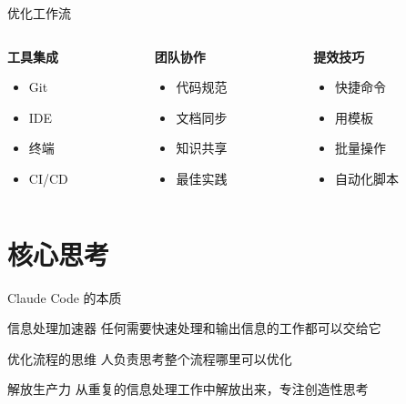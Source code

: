 \documentclass[aspectratio=169,xcolor=dvipsnames]{beamer}
\begin{document}
\begin{frame}{优化工作流}
  \begin{columns}
    \begin{column}{0.3\textwidth}
      \textbf{工具集成}
      \begin{itemize}
        \item Git
        \item IDE
        \item 终端
        \item CI/CD
      \end{itemize}
    \end{column}
    \begin{column}{0.3\textwidth}
      \textbf{团队协作}
      \begin{itemize}
        \item 代码规范
        \item 文档同步
        \item 知识共享
        \item 最佳实践
      \end{itemize}
    \end{column}
    \begin{column}{0.3\textwidth}
      \textbf{提效技巧}
      \begin{itemize}
        \item 快捷命令
        \item 用模板
        \item 批量操作
        \item 自动化脚本
      \end{itemize}
    \end{column}
  \end{columns}
\end{frame}

\section{核心思考}

\begin{frame}{Claude Code 的本质}
  \begin{block}{信息处理加速器}
    任何需要快速处理和输出信息的工作都可以交给它
  \end{block}

  \vspace{0.3cm}

  \begin{exampleblock}{优化流程的思维}
    人负责思考整个流程哪里可以优化
  \end{exampleblock}

  \vspace{0.3cm}

  \begin{alertblock}{解放生产力}
    从重复的信息处理工作中解放出来，专注创造性思考
  \end{alertblock}
\end{frame}
\end{document}
